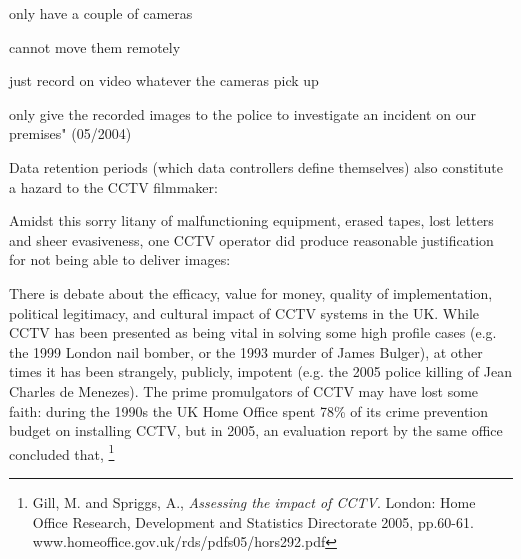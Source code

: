 {{\startitemize[packed]
\item only have a couple of cameras 
\item cannot move them remotely 
\item just record on video whatever the cameras pick up 
\item only give the recorded images to the police to investigate an
incident on our premises"
\stopitemize
(05/2004)}

Data retention periods (which data controllers define themselves) also
constitute a hazard to the CCTV filmmaker:


Amidst this sorry litany of malfunctioning equipment, erased tapes, lost
letters and sheer evasiveness, one CCTV operator did produce reasonable
justification for not being able to deliver images:



There is debate about the efficacy, value for money, quality of
implementation, political legitimacy, and cultural impact of CCTV
systems in the UK. While CCTV has been presented as being vital in
solving some high profile cases (e.g. the 1999 London nail bomber, or
the 1993 murder of James Bulger), at other times it has been strangely,
publicly, impotent (e.g. the 2005 police killing of Jean Charles de
Menezes). The prime promulgators of CCTV may have lost some faith:
during the 1990s the UK Home Office spent 78\% of its crime prevention
budget on installing CCTV, but in 2005, an evaluation report by the
same office concluded that,  \footnote{Gill, M. and Spriggs, A., {\em Assessing the impact of CCTV}.
London: Home Office Research, Development and Statistics Directorate 2005, pp.60{}-61. www.homeoffice.gov.uk/rds/pdfs05/hors292.pdf}

}
